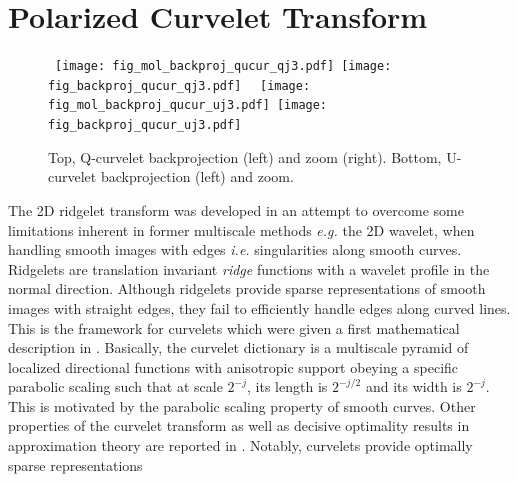 \section{Polarized Curvelet Transform}
\label{sec:pol_cur}
 \begin{figure*}[htb]
\centerline{
\vbox{
 \hbox{
 \texttt{[image: fig\_mol\_backproj\_qucur\_qj3.pdf]}
 \texttt{[image: fig\_backproj\_qucur\_qj3.pdf]}
 }
 \hbox{
 \texttt{[image: fig\_mol\_backproj\_qucur\_uj3.pdf]}
 \texttt{[image: fig\_backproj\_qucur\_uj3.pdf]}
 }
  }
 }
\caption{Top, Q-curvelet backprojection (left)  and zoom (right). Bottom, U-curvelet backprojection (left)  and zoom. }
\label{fig_qucur_back}
\end{figure*}
The 2D ridgelet transform \cite{cur:candes99_1} was developed in an attempt to overcome some limitations inherent in former multiscale methods 
\emph{e.g.} the 2D wavelet, when handling smooth images with edges \textit{i.e.} singularities along smooth curves. Ridgelets are translation 
invariant \emph{ridge} functions with a wavelet profile in the normal direction. Although ridgelets provide sparse representations of smooth 
images with straight edges, they fail to efficiently handle edges along curved lines. This is the framework for curvelets which were given a 
first mathematical description in \cite{Curvelets-StMalo}. Basically, the curvelet dictionary is a multiscale pyramid of localized directional 
functions with anisotropic support obeying a specific parabolic scaling such that at scale $2^{-j}$, its length is $2^{-j/2}$ and its width is $2^{-j}$. 
This is motivated by the parabolic scaling property of smooth curves. Other properties of the curvelet transform as well as decisive optimality results 
in approximation theory are reported in \cite{Curvelets-StMalo,CandesDonohoCurvelets}. Notably, curvelets provide optimally sparse representations 
